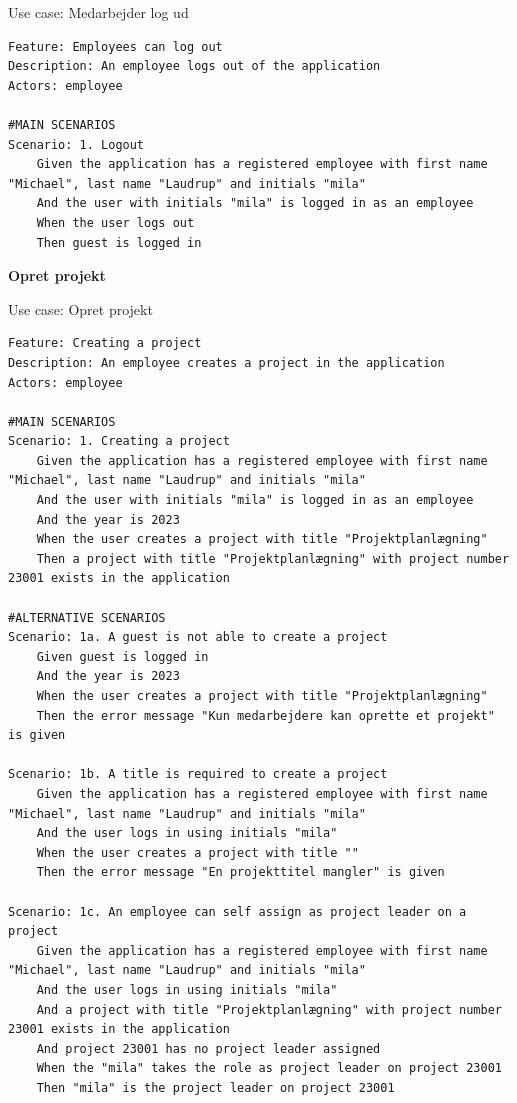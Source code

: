 \begin{listing}[H]
    \centering
    \caption{Use case: Medarbejder log ud}\label{lst:usecase_logout}
    \begin{verbatim}  
Feature: Employees can log out
Description: An employee logs out of the application
Actors: employee

#MAIN SCENARIOS
Scenario: 1. Logout
    Given the application has a registered employee with first name "Michael", last name "Laudrup" and initials "mila"
    And the user with initials "mila" is logged in as an employee
    When the user logs out
    Then guest is logged in
    \end{verbatim}
\end{listing}
\textbf{Opret projekt}
\begin{listing}[H]
    \centering
    \caption{Use case: Opret projekt}\label{lst:usecase_create_project}
    \begin{verbatim}  
Feature: Creating a project
Description: An employee creates a project in the application
Actors: employee

#MAIN SCENARIOS
Scenario: 1. Creating a project
    Given the application has a registered employee with first name "Michael", last name "Laudrup" and initials "mila"
    And the user with initials "mila" is logged in as an employee
    And the year is 2023
    When the user creates a project with title "Projektplanlægning" 
    Then a project with title "Projektplanlægning" with project number 23001 exists in the application

#ALTERNATIVE SCENARIOS
Scenario: 1a. A guest is not able to create a project
    Given guest is logged in
    And the year is 2023
    When the user creates a project with title "Projektplanlægning" 
    Then the error message "Kun medarbejdere kan oprette et projekt" is given

Scenario: 1b. A title is required to create a project
    Given the application has a registered employee with first name "Michael", last name "Laudrup" and initials "mila"
    And the user logs in using initials "mila"
    When the user creates a project with title ""
    Then the error message "En projekttitel mangler" is given

Scenario: 1c. An employee can self assign as project leader on a project
    Given the application has a registered employee with first name "Michael", last name "Laudrup" and initials "mila"
    And the user logs in using initials "mila"
    And a project with title "Projektplanlægning" with project number 23001 exists in the application
    And project 23001 has no project leader assigned
    When the "mila" takes the role as project leader on project 23001
    Then "mila" is the project leader on project 23001


\end{verbatim}
\end{listing}
